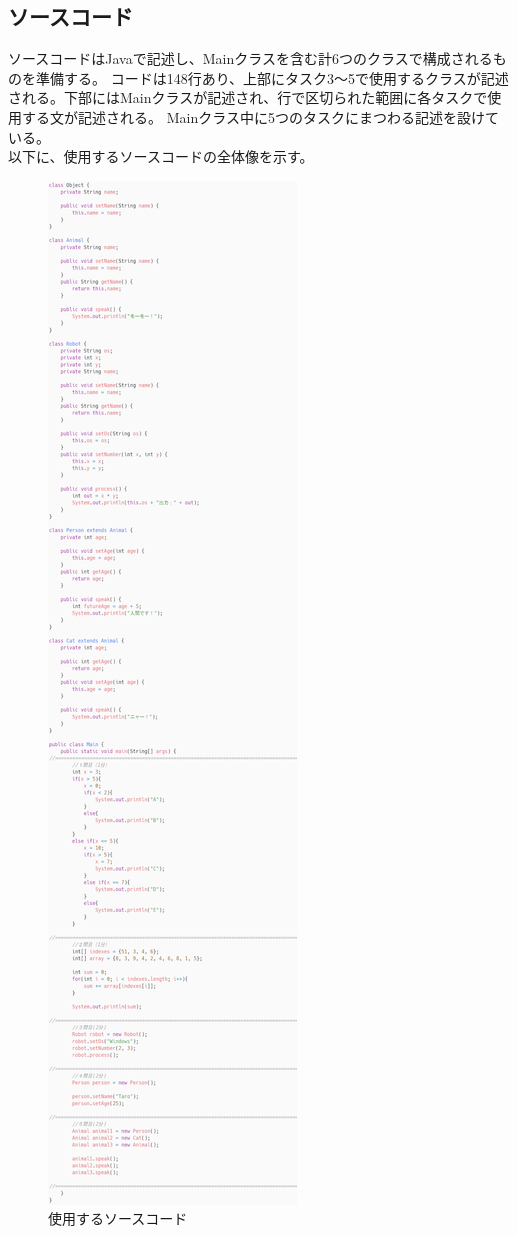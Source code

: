 \documentclass[paper=a4paper,fontsize=11pt]{jlreq}
\begin{document}
    \subsection{ソースコード}
      ソースコードはJavaで記述し、Mainクラスを含む計6つのクラスで構成されるものを準備する。
      コードは148行あり、上部にタスク3～5で使用するクラスが記述される。下部にはMainクラスが記述され、行で区切られた範囲に各タスクで使用する文が記述される。
      Mainクラス中に5つのタスクにまつわる記述を設けている。\\
      以下に、使用するソースコードの全体像を示す。
      \begin{figure}[h]
        \centering
        \includegraphics[height=\textheight]{carbon_clip_resized.png}
        \caption{使用するソースコード}
      \end{figure}
      \FloatBarrier
\end{document}
